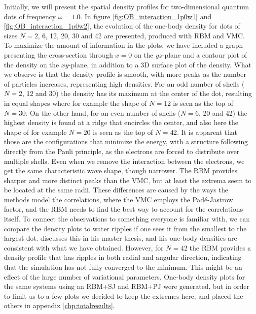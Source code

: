Initially, we will present the spatial density profiles for two-dimensional quantum dots of frequency $\omega=1.0$. In figure \eqref{fig:OB_interaction_1p0w1} and \eqref{fig:OB_interaction_1p0w2}, the evolution of the one-body density for dots of sizes $N=2$, 6, 12, 20, 30 and 42 are presented, produced with RBM and VMC. To maximize the amount of information in the plots, we have included a graph presenting the cross-section through $x=0$ on the $yz$-plane and a contour plot of the density on the $xy$-plane, in addition to a 3D surface plot of the density. What we observe is that the density profile is smooth, with more peaks as the number of particles increases, representing high densities. For an odd number of shells ($N=2$, 12 and 30) the density has its maximum at the center of the dot, resulting in equal shapes where for example the shape of $N=12$ is seen as the top of $N=30$. On the other hand, for an even number of shells ($N=6$, 20 and 42) the highest density is found at a ridge that encircles the center, and also here the shape of for example $N=20$ is seen as the top of $N=42$. It is apparent that those are the configurations that minimize the energy, with a structure following directly from the Pauli principle, as the electrons are forced to distribute over multiple shells. Even when we remove the interaction between the electrons, we get the same characteristic wave shape, though narrower. The RBM provides sharper and more distinct peaks than the VMC, but at least the extrema seem to be located at the same radii. These differences are caused by the ways the methods model the correlations, where the VMC employs the Padé-Jastrow factor, and the RBM needs to find the best way to account for the correlations itself. To connect the observations to something everyone is familiar with, we can compare the density plots to water ripples if one sees it from the smallest to the largest dot. \citet{hogberget_quantum_2013} discusses this in his master thesis, and his one-body densities are consistent with what we have obtained. However, for $N=42$ the RBM provides a density profile that has ripples in both radial and angular direction, indicating that the simulation has not fully converged to the minimum. This might be an effect of the large number of variational parameters. One-body density plots for the same systems using an RBM+SJ and RBM+PJ were generated, but in order to limit us to a few plots we decided to keep the extremes here, and placed the others in appendix \ref{chp:totalresults}.

